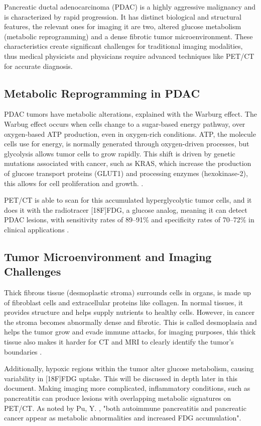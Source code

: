 \documentclass[11pt]{article} %
\begin{document}
Pancreatic ductal adenocarcinoma (PDAC) is a highly aggressive malignancy and is characterized by rapid progression. It has distinct biological and structural features, the relevant ones for imaging it are two, altered glucose metabolism (metabolic reprogramming) and a dense fibrotic tumor microenvironment. These characteristics create significant challenges for traditional imaging modalities, thus medical physicists and physicians require advanced techniques like PET/CT for accurate diagnosis.

\subsection{Metabolic Reprogramming in PDAC}

PDAC tumors have metabolic alterations, explained with the Warburg effect. The Warbug effect occurs when cells change to a sugar-based energy pathway, over oxygen-based ATP production, even in oxygen-rich conditions. ATP, the molecule cells use for energy, is normally generated through oxygen-driven processes, but glycolysis allows tumor cells to grow rapidly. This shift is driven by genetic mutations associated with cancer, such as KRAS, which increase the production of glucose transport proteins (GLUT1) and processing enzymes (hexokinase-2), this allows for cell proliferation and growth. \cite{Pubmed30721664, Pu2021}.


PET/CT is able to scan for this accumulated hyperglycolytic tumor cells, and it does it with the radiotracer [18F]FDG, a glucose analog, meaning it can detect PDAC lesions, with sensitivity rates of 89–91\% and specificity rates of 70–72\% in clinical applications \cite{Pu2021}.


\subsection{Tumor Microenvironment and Imaging Challenges}

Thick fibrous tissue (desmoplastic stroma) surrounds cells in organs, is made up of fibroblast cells and extracellular proteins like collagen. In normal tissues, it provides structure and helps supply nutrients to healthy cells. However, in cancer the stroma becomes abnormally dense and fibrotic. This is called desmoplasia and helps the tumor grow and evade immune attacks, for imaging purposes, this thick tissue also makes it harder for CT and MRI to clearly identify the tumor's boundaries \cite{NCCNGuidelines}.


Additionally, hypoxic regions within the tumor alter glucose metabolism, causing variability in [18F]FDG uptake. This will be discussed in depth later in this document. Making imaging more complicated, inflammatory conditions, such as pancreatitis can produce lesions with overlapping metabolic signatures on PET/CT. As noted by Pu, Y. \cite{Pu2021}, "both autoimmune pancreatitis and pancreatic cancer appear as metabolic abnormalities and increased FDG accumulation".
\end{document}
